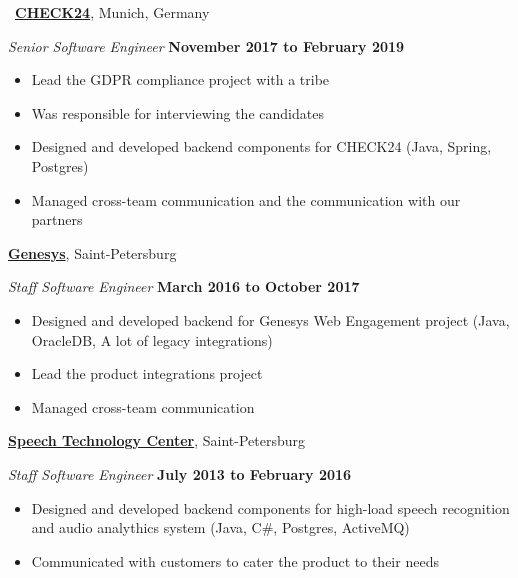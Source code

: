 \documentclass[10pt]{article}
\newcommand{\halfblankline}{\quad\vspace{-0.5\baselineskip}\pagebreak[3]}
\begin{document}
\vspace{0.2in}
\
\halfblankline
\href{https://www.check24.de}{\textbf{CHECK24}}, Munich, Germany
\begin{outerlist}
    \item[] \textit{Senior Software Engineer}
      \hfill \textbf{November 2017 to February 2019}
      \begin{itemize}
        \item Lead the GDPR compliance project with a tribe
        \item Was responsible for interviewing the candidates
        \item Designed and developed backend components for CHECK24 (Java, Spring, Postgres)
        \item Managed cross-team communication and the communication with our partners
        \end{itemize}
      \end{outerlist}
\vspace{0.2in}
\halfblankline
\href{http://www.genesys.com}{\textbf{Genesys}}, Saint-Petersburg
\begin{outerlist}
    \item[] \textit{Staff Software Engineer}
      \hfill \textbf{March 2016 to October 2017}
      \begin{itemize}
        \item Designed and developed backend for Genesys Web Engagement project (Java, OracleDB, A lot of legacy integrations)
        \item Lead the product integrations project
        \item Managed cross-team communication
        \end{itemize}
      \end{outerlist}
\pagebreak
\href{http://speechpro.com/}{\textbf{Speech Technology Center}}, Saint-Petersburg
\begin{outerlist}
    \item[] \textit{Staff Software Engineer}
            \hfill \textbf{July 2013 to February 2016}
            \begin{itemize}
               \item Designed and developed backend components for high-load speech recognition and audio analythics system (Java, C\#, Postgres, ActiveMQ)
               \item Communicated with customers to cater the product to their needs
            \end{itemize}
\end{outerlist}
\end{document}
